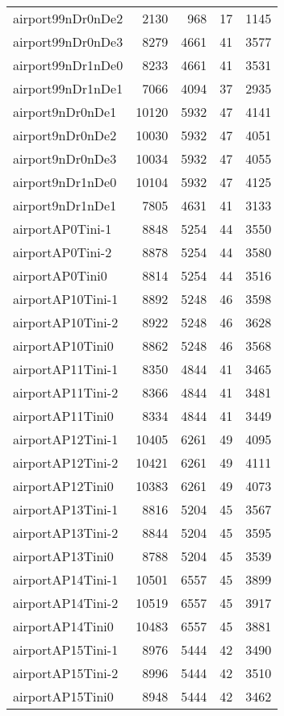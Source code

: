 \begin{longtable}{lrrrr}
airport99nDr0nDe2 & 2130 & 968 & 17 & 1145 \\
airport99nDr0nDe3 & 8279 & 4661 & 41 & 3577 \\
airport99nDr1nDe0 & 8233 & 4661 & 41 & 3531 \\
airport99nDr1nDe1 & 7066 & 4094 & 37 & 2935 \\
airport9nDr0nDe1 & 10120 & 5932 & 47 & 4141 \\
airport9nDr0nDe2 & 10030 & 5932 & 47 & 4051 \\
airport9nDr0nDe3 & 10034 & 5932 & 47 & 4055 \\
airport9nDr1nDe0 & 10104 & 5932 & 47 & 4125 \\
airport9nDr1nDe1 & 7805 & 4631 & 41 & 3133 \\
airportAP0Tini-1 & 8848 & 5254 & 44 & 3550 \\
airportAP0Tini-2 & 8878 & 5254 & 44 & 3580 \\
airportAP0Tini0 & 8814 & 5254 & 44 & 3516 \\
airportAP10Tini-1 & 8892 & 5248 & 46 & 3598 \\
airportAP10Tini-2 & 8922 & 5248 & 46 & 3628 \\
airportAP10Tini0 & 8862 & 5248 & 46 & 3568 \\
airportAP11Tini-1 & 8350 & 4844 & 41 & 3465 \\
airportAP11Tini-2 & 8366 & 4844 & 41 & 3481 \\
airportAP11Tini0 & 8334 & 4844 & 41 & 3449 \\
airportAP12Tini-1 & 10405 & 6261 & 49 & 4095 \\
airportAP12Tini-2 & 10421 & 6261 & 49 & 4111 \\
airportAP12Tini0 & 10383 & 6261 & 49 & 4073 \\
airportAP13Tini-1 & 8816 & 5204 & 45 & 3567 \\
airportAP13Tini-2 & 8844 & 5204 & 45 & 3595 \\
airportAP13Tini0 & 8788 & 5204 & 45 & 3539 \\
airportAP14Tini-1 & 10501 & 6557 & 45 & 3899 \\
airportAP14Tini-2 & 10519 & 6557 & 45 & 3917 \\
airportAP14Tini0 & 10483 & 6557 & 45 & 3881 \\
airportAP15Tini-1 & 8976 & 5444 & 42 & 3490 \\
airportAP15Tini-2 & 8996 & 5444 & 42 & 3510 \\
airportAP15Tini0 & 8948 & 5444 & 42 & 3462 \\

\end{longtable}

